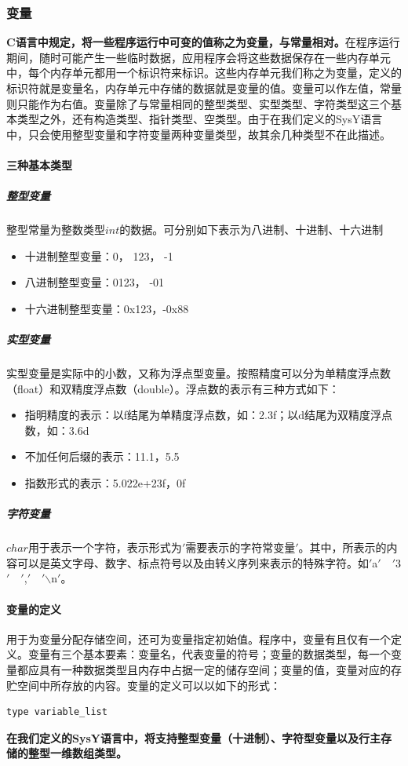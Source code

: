\documentclass[UTF8,a4paper,10pt]{ctexart}
\begin{document}
\subsubsection{变量}
\textbf{C语言中规定，将一些程序运行中可变的值称之为变量，与常量相对。}在程序运行期间，随时可能产生一些临时数据，应用程序会将这些数据保存在一些内存单元中，每个内存单元都用一个标识符来标识。这些内存单元我们称之为变量，定义的标识符就是变量名，内存单元中存储的数据就是变量的值。\cite{bl}变量可以作左值，常量则只能作为右值。变量除了与常量相同的整型类型、实型类型、字符类型这三个基本类型之外，还有构造类型、指针类型、空类型。由于在我们定义的SysY语言中，只会使用整型变量和字符变量两种变量类型，故其余几种类型不在此描述。
\paragraph{三种基本类型}
\subparagraph{整型变量}
  整型常量为整数类型$int$的数据。可分别如下表示为八进制、十进制、十六进制
    \begin{itemize}
    \item 十进制整型变量：0， 123， -1
    \item 八进制整型变量：0123， -01
    \item 十六进制整型变量：0x123，-0x88
    \end{itemize}
  \subparagraph{实型变量} 实型变量是实际中的小数，又称为浮点型变量。按照精度可以分为单精度浮点数（float）和双精度浮点数（double）。浮点数的表示有三种方式如下：
    \begin{itemize}
    \item 指明精度的表示：以f结尾为单精度浮点数，如：2.3f；以d结尾为双精度浮点数，如：3.6d
    \item 不加任何后缀的表示：11.1，5.5
    \item 指数形式的表示：5.022e+23f，0f
    \end{itemize}
  \subparagraph{字符变量} $char$用于表示一个字符，表示形式为$'$需要表示的字符常变量$'$。其中，所表示的内容可以是英文字母、数字、标点符号以及由转义序列来表示的特殊字符。如$'$a$'$\ \  $'$3$'$\ \  $'$,$'$\ \  $'$$\backslash$n$'$。
\paragraph{变量的定义} 用于为变量分配存储空间，还可为变量指定初始值。程序中，变量有且仅有一个定义。\cite{m}变量有三个基本要素：变量名，代表变量的符号；变量的数据类型，每一个变量都应具有一种数据类型且内存中占据一定的储存空间；变量的值，变量对应的存贮空间中所存放的内容。变量的定义可以以如下的形式：
\begin{lstlisting}[language = c++]
type variable_list
\end{lstlisting}
\textbf{在我们定义的SysY语言中，将支持整型变量（十进制）、字符型变量以及行主存储的整型一维数组类型。}
\end{document}

